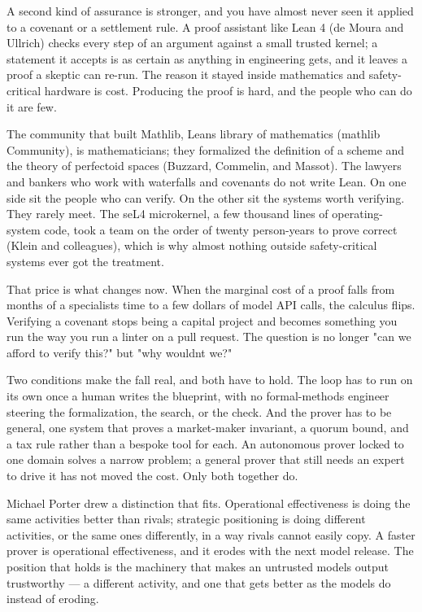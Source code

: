 \documentclass[
  11pt,
]{article}
\renewcommand{\_}{\origunderscore\allowbreak}
\begin{document}
A second kind of assurance is stronger, and you have almost never seen
it applied to a covenant or a settlement rule. A proof assistant like
Lean 4 (de Moura and Ullrich) checks every step of an argument against a
small trusted kernel; a statement it accepts is as certain as anything
in engineering gets, and it leaves a proof a skeptic can re-run. The
reason it stayed inside mathematics and safety-critical hardware is
cost. Producing the proof is hard, and the people who can do it are few.

The community that built Mathlib, Lean\textquotesingle s library of
mathematics (mathlib Community), is mathematicians; they formalized the
definition of a scheme and the theory of perfectoid spaces (Buzzard,
Commelin, and Massot). The lawyers and bankers who work with waterfalls
and covenants do not write Lean. On one side sit the people who can
verify. On the other sit the systems worth verifying. They rarely meet.
The seL4 microkernel, a few thousand lines of operating-system code,
took a team on the order of twenty person-years to prove correct (Klein
and colleagues), which is why almost nothing outside safety-critical
systems ever got the treatment.

That price is what changes now. When the marginal cost of a proof falls
from months of a specialist\textquotesingle s time to a few dollars of
model API calls, the calculus flips. Verifying a covenant stops being a
capital project and becomes something you run the way you run a linter
on a pull request. The question is no longer "can we afford to verify
this?" but "why wouldn\textquotesingle t we?"

Two conditions make the fall real, and both have to hold. The loop has
to run on its own once a human writes the blueprint, with no
formal-methods engineer steering the formalization, the search, or the
check. And the prover has to be general, one system that proves a
market-maker invariant, a quorum bound, and a tax rule rather than a
bespoke tool for each. An autonomous prover locked to one domain solves
a narrow problem; a general prover that still needs an expert to drive
it has not moved the cost. Only both together do.

Michael Porter drew a distinction that fits. Operational effectiveness
is doing the same activities better than rivals; strategic positioning
is doing different activities, or the same ones differently, in a way
rivals cannot easily copy. A faster prover is operational effectiveness,
and it erodes with the next model release. The position that holds is
the machinery that makes an untrusted model\textquotesingle s output
trustworthy --- a different activity, and one that gets better as the
models do instead of eroding.
\end{document}
